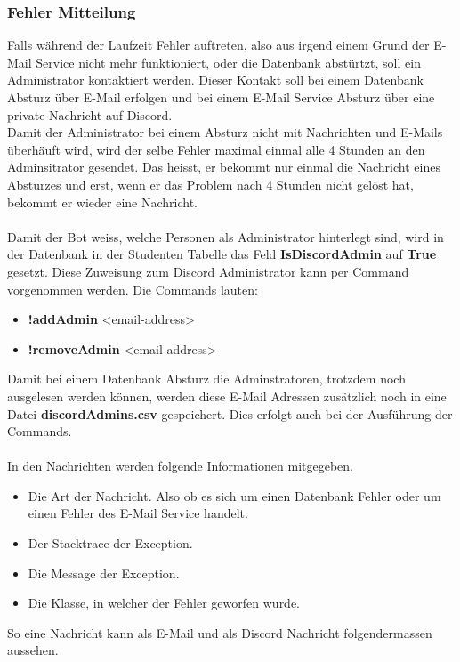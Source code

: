 \documentclass[a4paper, table]{article}
\begin{document}
\subsubsection{Fehler Mitteilung}
Falls während der Laufzeit Fehler auftreten, also aus irgend einem Grund der E-Mail Service nicht mehr funktioniert, 
oder die Datenbank abstürtzt, soll ein Administrator kontaktiert werden.
Dieser Kontakt soll bei einem Datenbank Absturz über E-Mail erfolgen und bei einem E-Mail Service Absturz über eine private Nachricht auf Discord.\\
Damit der Administrator bei einem Absturz nicht mit Nachrichten und E-Mails überhäuft wird, 
wird der selbe Fehler maximal einmal alle 4 Stunden an den Adminsitrator gesendet.
Das heisst, er bekommt nur einmal die Nachricht eines Absturzes und erst, wenn er das Problem nach 4 Stunden nicht gelöst hat, 
bekommt er wieder eine Nachricht.\\\\
Damit der Bot weiss, welche Personen als Administrator hinterlegt sind, 
wird in der Datenbank in der Studenten Tabelle das Feld \textbf{IsDiscordAdmin} auf \textbf{True} gesetzt.
Diese Zuweisung zum Discord Administrator kann per Command vorgenommen werden.
Die Commands lauten:
\begin{itemize}
    \item \textbf{!addAdmin} <email-address>
    \item \textbf{!removeAdmin} <email-address>
\end{itemize}
Damit bei einem Datenbank Absturz die Adminstratoren, trotzdem noch ausgelesen werden können, 
werden diese E-Mail Adressen zusätzlich noch in eine Datei \textbf{discordAdmins.csv} gespeichert.
Dies erfolgt auch bei der Ausführung der Commands.\\\\
In den Nachrichten werden folgende Informationen mitgegeben.
\begin{itemize}
    \item Die Art der Nachricht. Also ob es sich um einen Datenbank Fehler oder um einen Fehler des E-Mail Service handelt.
    \item Der Stacktrace der Exception.
    \item Die Message der Exception.
    \item Die Klasse, in welcher der Fehler geworfen wurde.
\end{itemize}
So eine Nachricht kann als E-Mail und als Discord Nachricht folgendermassen aussehen.
\end{document}
